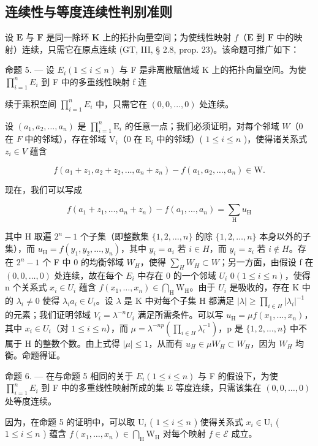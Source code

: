 \subsection{连续性与等度连续性判别准则}

设 \(\mathbf{E}\) 与 \(\mathbf{F}\) 是同一除环 \(\mathbf{K}\) 上的拓扑向量空间；为使线性映射 \(f\)（\(\mathbf{E}\) 到 \(\mathbf{F}\) 中的映射）连续，只需它在原点连续 (GT, III, § 2.8, prop. 23)。该命题可推广如下：

命题 5. --- 设 \(E_{i}(1 \leqslant i \leqslant n)\) 与 F 是非离散赋值域 K 上的拓扑向量空间。为使 \(\prod_{i=1}^{n} E_{i}\) 到 F 中的多重线性映射 f 连

续于乘积空间 \(\prod_{i=1}^{n} E_i\) 中，只需它在 \((0, 0, ..., 0)\) 处连续。

设 \((a_{1}, a_{2}, \ldots, a_{n})\) 是 \(\prod_{i=1}^{n} \mathrm{E}_{i}\) 的任意一点；我们必须证明，对每个邻域 \(W\)（0 在 \(F\) 中的邻域），存在邻域 \(\mathrm{V}_{i}\)（0 在 \(\mathrm{E}_{i}\) 中的邻域）( \(1 \leqslant i \leqslant n\) )，使得诸关系式 \(z_{i} \in V\) 蕴含

\[
f \left(a _ {1} + z _ {1}, a _ {2} + z _ {2}, \dots , a _ {n} + z _ {n}\right) - f \left(a _ {1}, a _ {2}, \dots , a _ {n}\right) \in \mathrm{W}.
\]

现在，我们可以写成

\[
f (a _ {1} + z _ {1}, \dots , a _ {n} + z _ {n}) - f (a _ {1}, \dots , a _ {n}) = \sum_ {\mathrm{H}} u _ {\mathrm{H}}
\]

其中 H 取遍 \(2^{n}-1\) 个子集（即整数集 \(\{1,2,\ldots,n\}\) 的除 \(\{1,2,\ldots,n\}\) 本身以外的子集），而 \(u_{\mathrm{H}}=f(y_{1},y_{2},\ldots,y_{n})\)，其中 \(y_{i}=a_{i}\) 若 \(i\in H\)，而 \(y_{i}=z_{i}\) 若 \(i\notin H\)。存在 \(2^{n}-1\) 个 F 中 0 的均衡邻域 \(W_{H}\)，使得 \(\sum_{H}W_{H}\subset W\)；另一方面，由假设 f 在 \((0,0,\ldots,0)\) 处连续，故在每个 \(E_{i}\) 中存在 0 的一个邻域 \(U_{i}\) \(0(1\leqslant i\leqslant n)\)，使得 n 个关系式 \(x_{i}\in U_{i}\) 蕴含 \(f(x_{1},\ldots,x_{n})\in\bigcap_{\mathrm{H}}\mathrm{W}_{\mathrm{H}}\)。由于 \(U_{i}\) 是吸收的，存在 K 中的 \(\lambda_{i}\neq0\) 使得 \(\lambda_{i}a_{i}\in U_{i}\)。设 \(\lambda\) 是 K 中对每个子集 H 都满足 \(|\lambda|\geqslant\prod_{i\in H}|\lambda_{i}|^{-1}\) 的元素；我们证明邻域 \(V_{i}=\lambda^{-n}U_{i}\) 满足所需条件。可以写 \(u_{\mathrm{H}}=\mu f(x_{1},\ldots,x_{n})\)，其中 \(x_{i}\in U_{i}\)（对 \(1\leqslant i\leqslant n\)），而 \(\mu=\lambda^{-np}(\prod_{i\in H}\lambda_{i}^{-1})\)，p 是 \(\{1,2,\ldots,n\}\) 中不属于 H 的整数个数。由上式得 \(|\mu|\leqslant1\)，从而有 \(u_{H}\in\mu W_{H}\subset W_{H}\)，因为 \(W_{H}\) 均衡。命题得证。

命题 6. --- 在与命题 5 相同的关于 \(E_{i}(1 \leqslant i \leqslant n)\) 与 F 的假设下，为使 \(\prod_{i=1}^{n} E_{i}\) 到 F 中的多重线性映射所成的集 E 等度连续，只需该集在 \((0, 0, \ldots, 0)\) 处等度连续。

因为，在命题 5 的证明中，可以取 \(\mathrm{U}_i\) ( \(1 \leqslant i \leqslant n\) ) 使得关系式 \(x_i \in \mathrm{U}_i\) ( \(1 \leqslant i \leqslant n\) ) 蕴含 \(f(x_1, \ldots, x_n) \in \bigcap_{\mathrm{H}} \mathrm{W}_{\mathrm{H}}\) 对每个映射 \(f \in \mathcal{E}\) 成立。

